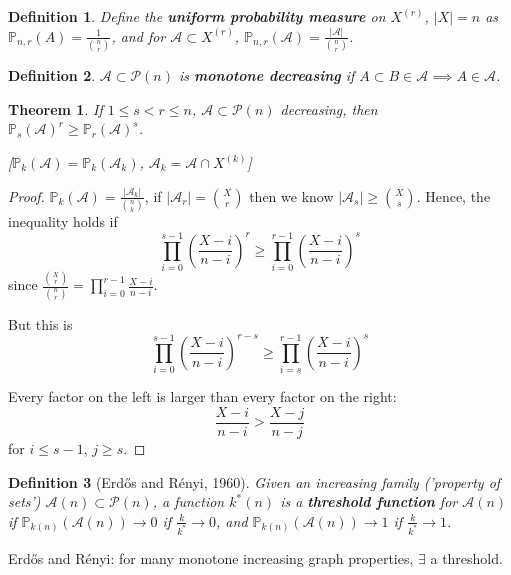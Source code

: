 \documentclass[a4paper]{article}
\newtheorem*{definition}{Definition}
\newtheorem{theorem}{Theorem}
\newcommand*\abs[1]{\left|#1\right|}
\begin{document}
\begin{definition}
	Define the \textbf{uniform probability measure} on $X^{(r)}$, $\abs{X}=n$ as $\mathbb{P}_{n,r}(A) = \frac{1}{{n \choose r}}$, and for $\mathcal{A} \subset X^{(r)}$, $\mathbb{P}_{n,r}(\mathcal{A}) = \frac{\abs{\mathcal{A}}}{{n \choose r}}$.
\end{definition}

\begin{definition}
	$\mathcal{A} \subset \mathcal{P}(n)$ is \textbf{monotone decreasing} if $A \subset B \in \mathcal{A} \implies A \in \mathcal{A}$.
\end{definition}

\begin{theorem}
	If $1 \leq s < r \leq n$, $\mathcal{A} \subset \mathcal{P}(n)$ decreasing,
	then $\mathbb{P}_s(\mathcal{A})^r \geq \mathbb{P}_r(\mathcal{A})^s$.
	
	[$\mathbb{P}_k(\mathcal{A}) = \mathbb{P}_k(\mathcal{A}_k)$, $\mathcal{A}_k = \mathcal{A} \cap X^{(k)}$]
\end{theorem}
\begin{proof}
	$\mathbb{P}_k(\mathcal{A}) = \frac{\abs{\mathcal{A}_k}}{{n \choose k}}$,
	if $\abs{\mathcal{A}_r}={X \choose r}$ then we know $\abs{\mathcal{A}_s} \geq {X \choose s}$.
	Hence, the inequality holds if
	$$\prod_{i=0}^{s-1} \left(\frac{X-i}{n-i}\right)^r \geq \prod_{i=0}^{r-1} \left(\frac{X-i}{n-i}\right)^s$$
	since $\frac{{X \choose r}}{{n \choose r}} = \prod_{i=0}^{r-1}\frac{X-i}{n-i}$.
	
	But this is
	$$\prod_{i=0}^{s-1} \left(\frac{X-i}{n-i}\right)^{r-s} \geq \prod_{i=s}^{r-1} \left(\frac{X-i}{n-i}\right)^s$$
	
	Every factor on the left is larger than every factor on the right:
	$$\frac{X-i}{n-i} > \frac{X-j}{n-j}$$
	for $i \leq s-1$, $j \geq s$.
\end{proof}

\begin{definition}[Erd\H{o}s and R\'enyi, 1960]
	Given an increasing family ('property of sets') $\mathcal{A}(n) \subset \mathcal{P}(n)$,
	a function $k^*(n)$ is a \textbf{threshold function} for $\mathcal{A}(n)$
	if $\mathbb{P}_{k(n)}(\mathcal{A}(n)) \to 0$ if $\frac{k}{k^*} \to 0$,
	and $\mathbb{P}_{k(n)}(\mathcal{A}(n)) \to 1$ if $\frac{k}{k^*} \to 1$.
\end{definition}

Erd\H{o}s and R\'enyi: for many monotone increasing graph properties, $\exists$ a threshold.
\end{document}
